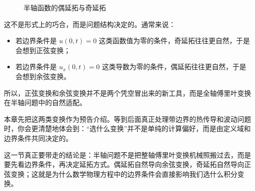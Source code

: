 \begin{figure}[htbp]
\centering
{}
\caption{半轴函数的偶延拓与奇延拓}
\label{fig:even-odd-extension}
\end{figure}

\begin{tishi}[边界条件为什么会影响变换选择]
这不是形式上的巧合，而是问题结构决定的。通常来说：
\begin{itemize}
    \item 若边界条件是 $u(0,t)=0$ 这类函数值为零的条件，奇延拓往往更自然，于是会想到正弦变换；
    \item 若边界条件是 $u_x(0,t)=0$ 这类导数为零的条件，偶延拓往往更自然，于是会想到余弦变换。
\end{itemize}

所以，正弦变换和余弦变换并不是两个凭空冒出来的新工具，而是全轴傅里叶变换在半轴问题中的自然适配。
\end{tishi}

\begin{zhu}{}{}
本章先把这两类变换作为预告介绍。等到后面真正处理带边界的热传导和波动问题时，你会更清楚地体会到：``选什么变换''并不是单纯的计算偏好，而是由定义域和边界条件共同决定的。
\end{zhu}

\begin{tishi}[本节小结]
这一节真正要带走的结论是：半轴问题不是把整轴傅里叶变换机械照搬过去，而是要先看边界条件，再决定延拓方式。偶延拓自然导向余弦变换，奇延拓自然导向正弦变换；这就是为什么数学物理方程中的边界条件会直接影响我们选什么积分变换。
\end{tishi}

